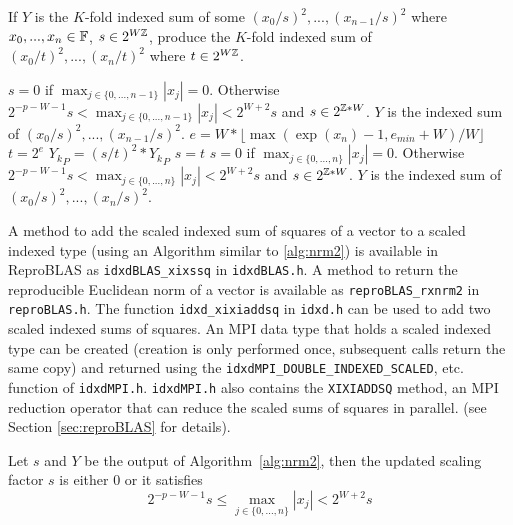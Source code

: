     \begin{samepage}
    \begin{alg}
      If $Y$ is the $K$-fold indexed sum of some $(x_0/s)^2, ..., (x_{n - 1}/s)^2$ where $x_0, ..., x_{n} \in \mathbb{F}$, $s \in 2^{W\mathbb{Z}}$, produce the $K$-fold indexed sum of $(x_0/t)^2, ..., (x_{n}/t)^2$ where $t \in 2^{W\mathbb{Z}}$. 
      \begin{algorithmic}[1]
        \Require
        \Statex $s=0$ if $\max_{j \in \{0, ..., n - 1\}}|x_j| = 0$.
        Otherwise $2^{-p-W-1} s < \max_{j \in \{0, ..., n - 1\}}|x_j| < 2^{W+2} s$
        and $s \in 2^{\mathbb{Z}*W}$.
        \Statex $Y$ is the indexed sum of $(x_0/s)^2, ..., (x_{n-1}/s)^2$.
          \State $e = W * \lfloor\max(\exp(x_n) - 1,e_{min}+W) / W\rfloor$
              \label{alg:nrm2.line.e}
          \State $t = 2^e$
                  \State ${Y_k}_P = (s/t)^2 * {Y_k}_P$
              \EndFor
              \State $s = t$
          \EndIf
        \State {}
      \EndFunction
      \Ensure
      \Statex $s=0$ if $\max_{j \in \{0, ..., n\}}|x_j| = 0$.
      Otherwise $2^{-p-W-1} s < \max_{j \in \{0, ..., n\}}|x_j| < 2^{W+2} s$
      and $s \in 2^{\mathbb{Z}*W}$.
      \Statex $Y$ is the indexed sum of $(x_0/s)^2, ..., (x_{n}/s)^2$.
      \end{algorithmic}
      \label{alg:nrm2}
    \end{alg}
    \end{samepage}

    A method to add the scaled indexed sum of squares of a vector to a scaled indexed type (using an Algorithm similar to \ref{alg:nrm2}) is available in ReproBLAS as \texttt{idxdBLAS\_xixssq} in \texttt{idxdBLAS.h}. A method to return the reproducible Euclidean norm of a vector is available as \texttt{reproBLAS\_rxnrm2} in \texttt{reproBLAS.h}. The function \texttt{idxd\_xixiaddsq} in \texttt{idxd.h} can be used to add two scaled indexed sums of squares. An MPI data type that holds a scaled indexed type can be created (creation is only performed once, subsequent calls return the same copy) and returned using the \texttt{idxdMPI\_DOUBLE\_INDEXED\_SCALED}, etc. function of \texttt{idxdMPI.h}. \texttt{idxdMPI.h} also contains the \texttt{XIXIADDSQ} method, an MPI reduction operator that can reduce the scaled sums of squares in parallel. (see Section \ref{sec:reproBLAS} for details).


    \begin{lem}
    \label{lem:nrm2_scaling}
    Let $s$ and $Y$ be the output of Algorithm~\ref{alg:nrm2}, then the updated scaling factor $s$ is either $0$ or it satisfies
    \begin{equation}
        2^{-p-W-1}s \leq \max_{j \in \{0, ..., n\}}|x_j| < 2^{W+2} s
    \end{equation}
    \end{lem}

